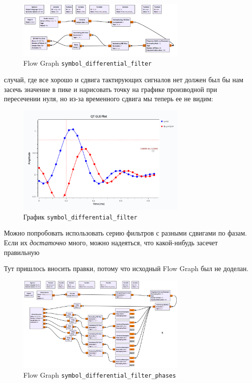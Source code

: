 \documentclass[a4paper,12pt]{report}
\begin{document}
    \begin{figure}[H]
        \centering
        \includegraphics[width=0.75\textwidth]{images/symbol_differential_filter_fg.png}
        \caption{Flow Graph \texttt{symbol\_differential\_filter}}
        \label{fig:symbol_differential_filter_fg}
    \end{figure}
    
     случай, где все хорошо и сдвига тактирующих сигналов нет должен был бы нам засечь значение в пике и нарисовать точку на графике производной при пересечении нуля, но из-за временного сдвига мы теперь ее не видим:
    
    \begin{figure}[H]
        \centering
        \includegraphics[width=0.75\textwidth]{images/symbol_differential_filter_plot.png}
        \caption{График \texttt{symbol\_differential\_filter}}
        \label{fig:symbol_differential_filter_plot}
    \end{figure}
    
    Можно попробовать использовать серию фильтров с разными сдвигами по фазам. Если их \emph{достаточно} много, можно надеяться, что какой-нибудь засечет правильную
    
    Тут пришлось вносить правки, потому что исходный Flow Graph был не доделан.
    
    \begin{figure}[H]
        \centering
        \includegraphics[width=0.75\textwidth]{images/symbol_differential_filter_phases_fg.png}
        \caption{Flow Graph \texttt{symbol\_differential\_filter\_phases}}
        \label{fig:symbol_differential_filter_phases_fg}
    \end{figure}
    
\end{document}
